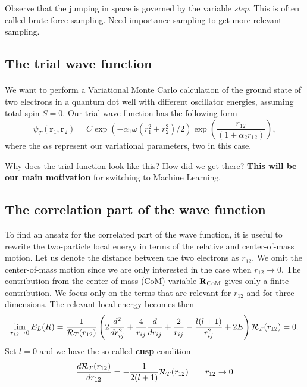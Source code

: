 \documentclass[%
oneside,                 %
final,                   %
10pt]{article}
\begin{document}
\noindent
Observe that the jumping in space is governed by the variable \emph{step}. This is often called brute-force sampling.
Need importance sampling to get more relevant sampling.



\subsection{The trial wave function}

\paragraph{}
We want to perform  a Variational Monte Carlo calculation of the ground state of two electrons in a quantum dot well with different oscillator energies, assuming total spin $S=0$.
Our trial wave function has the following form
\begin{equation}
   \psi_{T}(\bm{r}_1,\bm{r}_2) = 
   C\exp{\left(-\alpha_1\omega(r_1^2+r_2^2)/2\right)}
   \exp{\left(\frac{r_{12}}{(1+\alpha_2 r_{12})}\right)}, 
\label{eq:trial}
\end{equation}
where the $\alpha$s represent our variational parameters, two in this case.

Why does the trial function look like this? How did we get there? \textbf{This will be our main motivation} for switching to
Machine Learning.



\subsection{The correlation part of the wave function}

To find an ansatz for the correlated part of the wave function, it is useful to rewrite the two-particle
local energy in terms of the relative and center-of-mass motion.
Let us denote the distance between the two electrons as
$r_{12}$. We omit the center-of-mass motion since we are only interested in the case when
$r_{12} \rightarrow 0$. The contribution from the center-of-mass (CoM) variable ${\bf R}_{\mathrm{CoM}}$
gives only a finite contribution.
We focus only on the terms that are relevant for $r_{12}$ and for three dimensions. The relevant local energy becomes then
\[
\lim_{r_{12} \rightarrow 0}E_L(R)=
    \frac{1}{{\cal R}_T(r_{12})}\left(2\frac{d^2}{dr_{ij}^2}+\frac{4}{r_{ij}}\frac{d}{dr_{ij}}+
\frac{2}{r_{ij}}-\frac{l(l+1)}{r_{ij}^2}+2E
\right){\cal R}_T(r_{12}) = 0.
\]
Set $l=0$ and we have the so-called \textbf{cusp} condition
\[
\frac{d {\cal R}_T(r_{12})}{dr_{12}} = -\frac{1}{2(l+1)}
{\cal R}_T(r_{12})\qquad r_{12}\to 0
\]
\end{document}
